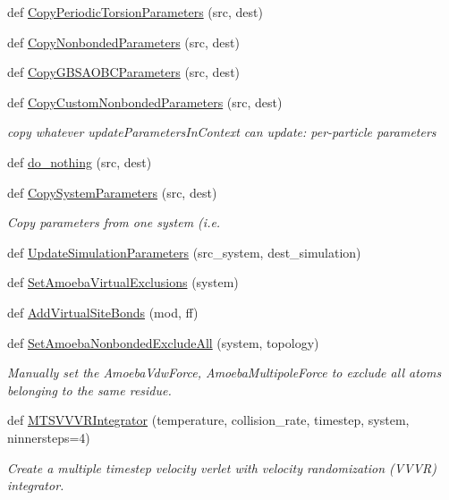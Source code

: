 \begin{DoxyCompactItemize}
def \hyperlink{namespacesrc_1_1openmmio_a69e8771291135627a9500f379be6746d}{Copy\+Periodic\+Torsion\+Parameters} (src, dest)
\item 
def \hyperlink{namespacesrc_1_1openmmio_a839c303fbea5ec7b5241d5bd22a32066}{Copy\+Nonbonded\+Parameters} (src, dest)
\item 
def \hyperlink{namespacesrc_1_1openmmio_a2b19364e1d03f9345add59a55f408a49}{Copy\+G\+B\+S\+A\+O\+B\+C\+Parameters} (src, dest)
\item 
def \hyperlink{namespacesrc_1_1openmmio_a0317b5a3aac0ab5a6da3d11d91d493f4}{Copy\+Custom\+Nonbonded\+Parameters} (src, dest)
\begin{DoxyCompactList}\small\item\em copy whatever update\+Parameters\+In\+Context can update\+: per-\/particle parameters \end{DoxyCompactList}\item 
def \hyperlink{namespacesrc_1_1openmmio_a4e11fdb61d3e9174f761f7ba87b0fb4c}{do\+\_\+nothing} (src, dest)
\item 
def \hyperlink{namespacesrc_1_1openmmio_aeab37a6fcba5be52553047efcdb14f58}{Copy\+System\+Parameters} (src, dest)
\begin{DoxyCompactList}\small\item\em Copy parameters from one system (i.\+e. \end{DoxyCompactList}\item 
def \hyperlink{namespacesrc_1_1openmmio_adc5e020218883a8a87f7e1810d0a155e}{Update\+Simulation\+Parameters} (src\+\_\+system, dest\+\_\+simulation)
\item 
def \hyperlink{namespacesrc_1_1openmmio_a47edd2998916d71f064a34a8ab232e31}{Set\+Amoeba\+Virtual\+Exclusions} (system)
\item 
def \hyperlink{namespacesrc_1_1openmmio_a67650529d4176645bc663bced5ac3c64}{Add\+Virtual\+Site\+Bonds} (mod, ff)
\item 
def \hyperlink{namespacesrc_1_1openmmio_af1cd2d40bf806bf32b8bd4f90677bf12}{Set\+Amoeba\+Nonbonded\+Exclude\+All} (system, topology)
\begin{DoxyCompactList}\small\item\em Manually set the Amoeba\+Vdw\+Force, Amoeba\+Multipole\+Force to exclude all atoms belonging to the same residue. \end{DoxyCompactList}\item 
def \hyperlink{namespacesrc_1_1openmmio_aa8e806e2d494fc1c36153e8523ba99ff}{M\+T\+S\+V\+V\+V\+R\+Integrator} (temperature, collision\+\_\+rate, timestep, system, ninnersteps=4)
\begin{DoxyCompactList}\small\item\em Create a multiple timestep velocity verlet with velocity randomization (V\+V\+VR) integrator. \end{DoxyCompactList}\end{DoxyCompactItemize}
